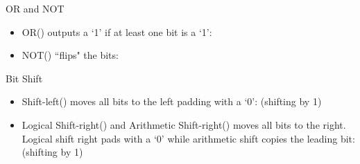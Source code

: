 \begin{frame}[fragile]{OR and NOT}
\begin{itemize}
\item OR(\code{\texttt{|}}) outputs a `1' if at least one bit is a `1':

\begin{semiverbatim}\end{semiverbatim}
\pause
\item NOT(\code{\texttt{\textasciitilde}}) ``flips" the bits:

\begin{semiverbatim}\end{semiverbatim}
\end{itemize}
\end{frame}


\begin{frame}[fragile]{Bit Shift}
\begin{itemize}
\item Shift-left(\code{\texttt{<<}}) moves all bits to the left padding with a `0': (shifting by 1)

\begin{semiverbatim}\end{semiverbatim}
\pause

\item Logical Shift-right(\code{\texttt{>>}}) and Arithmetic Shift-right(\code{\texttt{>>>}}) moves all bits to the right. Logical shift right pads with a `0' while arithmetic shift copies the leading bit: (shifting by 1)

\begin{semiverbatim}\end{semiverbatim}
\end{itemize}
\end{frame}

